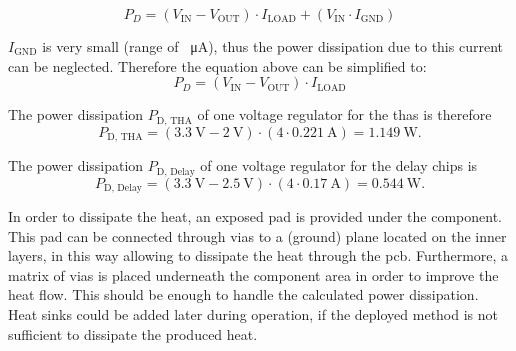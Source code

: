 \begin{equation}
	P_D = (V_\text{IN} - V_\text{OUT}) \cdot I_\text{LOAD} + (V_\text{IN} \cdot I_\text{GND})
\end{equation}

$I_\text{GND}$ is very small (range of \SI{}{\micro \ampere}), thus the power dissipation due to this current can be neglected.
Therefore the equation above can be simplified to:
\begin{equation}
	P_D = (V_\text{IN} - V_\text{OUT}) \cdot I_\text{LOAD}
\end{equation}

The power dissipation $P_\text{D, THA}$ of one voltage regulator for the \glspl{tha} is therefore
\begin{equation}
	P_\text{D, THA} = (\SI{3.3}{\volt} - \SI{2}{\volt}) \cdot (4 \cdot \SI{0.221}{\ampere}) = \SI{1.149}{\watt}.
\end{equation}

The power dissipation $P_\text{D, Delay}$ of one voltage regulator for the delay chips is 
\begin{equation}
	P_\text{D, Delay} = (\SI{3.3}{\volt} - \SI{2.5}{\volt}) \cdot (4 \cdot \SI{0.17}{\ampere}) = \SI{0.544}{\watt}.
\end{equation}

In order to dissipate the heat, an exposed pad is provided under the component.
This pad can be connected through vias to a (ground) plane located on the inner layers, in this way allowing to dissipate the heat through the \gls{pcb}.
Furthermore, a matrix of vias is placed underneath the component area in order to improve the heat flow.
This should be enough to handle the calculated power dissipation.
Heat sinks could be added later during operation, if the deployed method is not sufficient to dissipate the produced heat.

\clearpage
